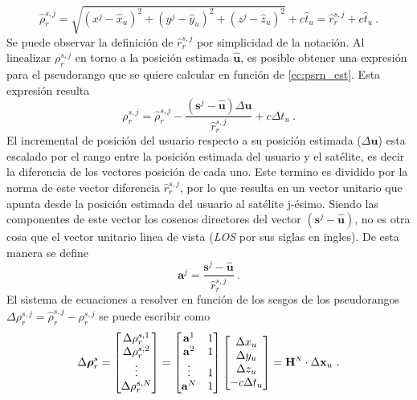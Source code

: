 \documentclass[a4paper,12pt,oneside,onecolumn,final,openright]{book}%
\begin{document}
\begin{equation}\label{ec:psrn_est}
	\hat{\rho}_r^{s,j} = \sqrt{(x^j-\hat{x}_u)^2+(y^j-\hat{y}_u)^2+(z^j-\hat{z}_u)^2} + c\hat{t}_u = \hat{r}_r^{s,j} + c\hat{t}_u \ .
\end{equation}
	Se puede observar la definición de $\hat{r}_r^{s,j}$ por simplicidad de la notación. Al linealizar $\rho_r^{s,j}$ en torno a la posición estimada $\hat{\mathbf{u}}$, es posible obtener una expresión para el pseudorango que se quiere calcular en función de \eqref{ec:psrn_est}. Esta expresión resulta
\begin{equation}
	\rho_r^{s,j} = \hat{\rho}_r^{s,j} - \dfrac{(\mathbf{s}^j - \hat{\mathbf{u}})\Delta \mathbf{u}}{\hat{r}_r^{s,j}} + c\Delta t_u \ .
\end{equation}
	El incremental de posición del usuario respecto a su posición estimada ($\Delta \mathbf{u}$) esta escalado por el rango entre la posición estimada del usuario y el satélite, es decir la diferencia de los vectores posición de cada uno. Este termino es dividido por la norma de este vector diferencia $\hat{r}_r^{s,j}$, por lo que resulta en un vector unitario que apunta desde la posición estimada del usuario al satélite j-ésimo. Siendo las componentes de este vector los cosenos directores del vector $(\mathbf{s}^j - \hat{\mathbf{u}})$, no es otra cosa que el vector unitario linea de vista (\textit{LOS} por sus siglas en ingles). De esta manera se define
\begin{equation}\label{ec:uLOS}
	\mathbf{a}^j = \dfrac{\mathbf{s}^j-\hat{\mathbf{u}}}{\hat{r}_r^{s,j}} \ .
\end{equation}	
	El sistema de ecuaciones a resolver en función de los sesgos de los pseudorangos $\Delta\rho_r^{s,j} = \hat{\rho}_r^{s,j}-\rho_r^{s,j}$ se puede escribir como
\begin{equation}
	\Delta \boldsymbol{\rho}_r^s = \begin{bmatrix}
\Delta \rho_r^{s,1} \\
\Delta \rho_r^{s,2} \\
\vdots \\
\Delta \rho_r^{s,N} 
\end{bmatrix} = \begin{bmatrix}
\mathbf{a}^1 & 1 \\
\mathbf{a}^2 & 1 \\
\vdots & 1 \\
\mathbf{a}^N & 1 
\end{bmatrix} \begin{bmatrix}
\Delta x_u \\
\Delta y_u \\
\Delta z_u \\
-c\Delta t_u 
\end{bmatrix} = \mathbf{H}^{\scaleto{N}{4pt}}\cdot \Delta \mathbf{x}_u \ .
\end{equation}
\end{document}
